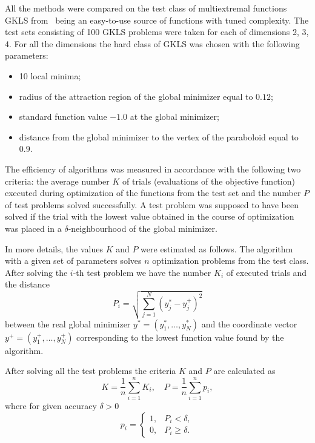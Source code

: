 \documentclass[preprint]{elsarticle}
\begin{document}
All the methods were compared on the test class of multiextremal functions GKLS from~\cite{bib48} being an easy-to-use source of functions with tuned complexity. The test sets consisting of 100 GKLS problems were taken for each of dimensions 2, 3, 4. For all the dimensions the hard class of GKLS was chosen with the following parameters:
\begin{itemize}
  \setlength\itemsep{0em}

  \item 10 local minima;
  \item radius of the attraction region of the global minimizer equal to $0.12$;
  \item standard function value $-1.0$ at the global minimizer;
  \item distance from the global minimizer to the vertex of the paraboloid equal to $0.9$.
\end{itemize}

The efficiency of algorithms was measured in accordance with the following two criteria: the average number $K$ of trials (evaluations of the objective function) executed during optimization of the functions from the test set and the number $P$ of test problems solved successfully. A test problem was supposed to have been solved if the trial with the lowest value obtained in the course of optimization was placed in a $\delta$-neighbourhood of the global minimizer.

In more details, the values $K$ and $P$ were estimated as follows. The algorithm with a given set of parameters solves $n$ optimization problems from the test class. After solving the $i$-th test problem we have the number $K_i$ of executed trials and the distance
\begin{equation}
  P_i = \sqrt{\sum_{j = 1}^{N} ( y_j^* - y_j^+ )^2}
\end{equation}
%
between the real global minimizer $y^* = (y_1^*, \dots, y_N^*)$ and the coordinate vector $y^+ = (y_1^+, \dots, y_N^+)$ corresponding to the lowest function value found by the algorithm.

After solving all the test problems the criteria $K$ and $P$ are calculated as
\begin{equation}
  K = \frac{1}{n} \sum_{i = 1}^{n} K_i, \quad P = \frac{1}{n}\sum_{i = 1}^{n} p_i,
\end{equation}
%
where for given accuracy $\delta > 0$
\begin{equation}
  p_i =
  \begin{cases}
    1, & P_i <    \delta, \\
    0, & P_i \geq \delta.
  \end{cases}
\end{equation}
\end{document}
